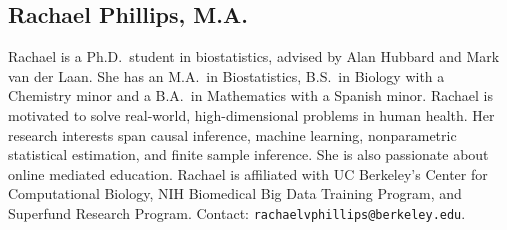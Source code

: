 \documentclass[a4paper,11pt]{texMemo}
\begin{document}
\vspace{-.5em}

\subsection*{Rachael Phillips, M.A.}

\vspace{-.5em}

Rachael is a Ph.D.~student in biostatistics, advised by Alan Hubbard and Mark
van der Laan. She has an M.A.~in Biostatistics, B.S.~in Biology with a
Chemistry minor and a B.A.~in Mathematics with a Spanish minor. Rachael is
motivated to solve real-world, high-dimensional problems in human health. Her
research interests span causal inference, machine learning, nonparametric
statistical estimation, and finite sample inference. She is also passionate
about online mediated education. Rachael is affiliated with UC Berkeley's Center
for Computational Biology, NIH Biomedical Big Data Training Program, and
Superfund Research Program. Contact: \texttt{rachaelvphillips@berkeley.edu}.
\end{document}
